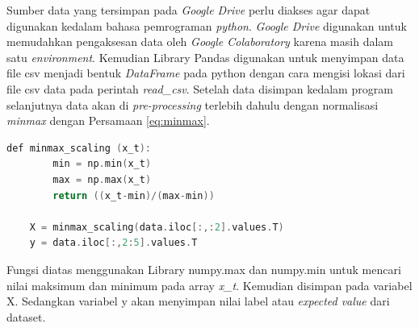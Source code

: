 Sumber data yang tersimpan pada \textit{Google Drive} perlu diakses agar dapat digunakan kedalam bahasa pemrograman \textit{python}. \textit{Google Drive} digunakan untuk memudahkan pengaksesan data oleh \textit{Google Colaboratory} karena masih dalam satu \textit{environment}. Kemudian Library Pandas digunakan untuk menyimpan data file csv menjadi bentuk \textit{DataFrame} pada python dengan cara mengisi lokasi dari file csv data pada perintah \textit{read\_csv}. Setelah data disimpan kedalam program selanjutnya data akan di \textit{pre-processing} terlebih dahulu dengan normalisasi \textit{minmax} dengan Persamaan \ref{eq:minmax}.

\begin{lstlisting}[language=C]
    def minmax_scaling (x_t):
        min = np.min(x_t)
        max = np.max(x_t)
        return ((x_t-min)/(max-min))
        
    X = minmax_scaling(data.iloc[:,:2].values.T)
    y = data.iloc[:,2:5].values.T
\end{lstlisting}

Fungsi diatas menggunakan Library numpy.max dan numpy.min untuk mencari nilai maksimum dan minimum pada array \textit{x\_t}. Kemudian  disimpan pada variabel X. Sedangkan variabel y akan menyimpan nilai label atau \textit{expected value} dari dataset.

